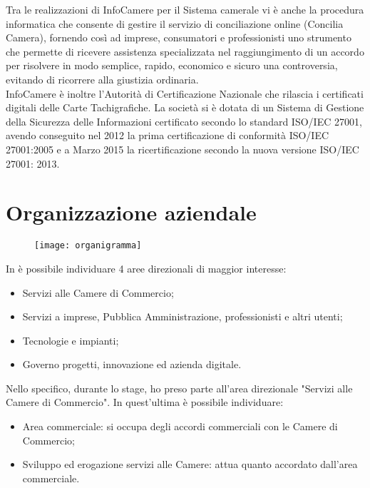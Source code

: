 	Tra le realizzazioni di InfoCamere per il Sistema camerale vi è anche la procedura informatica che consente di gestire il servizio di conciliazione online (Concilia Camera), fornendo così ad imprese, consumatori e professionisti uno strumento che permette di ricevere assistenza specializzata nel raggiungimento di un accordo per risolvere in modo semplice, rapido, economico e sicuro una controversia, evitando di ricorrere alla giustizia ordinaria. \\
	InfoCamere è inoltre l'Autorità di Certificazione Nazionale che rilascia i certificati digitali delle Carte Tachigrafiche.
	La società si è dotata di un Sistema di Gestione della Sicurezza delle Informazioni certificato secondo lo standard ISO/IEC 27001, avendo conseguito nel 2012 la prima certificazione di conformità ISO/IEC 27001:2005 e a Marzo 2015 la ricertificazione secondo la nuova versione ISO/IEC 27001: 2013.

\section{Organizzazione aziendale}
\label{sec:organizzazione_aziendale}

	\begin{figure}[htbp]
		\begin{center}
			\texttt{[image: organigramma]}
		\end{center}
	\end{figure}

	In \nomeAzienda è possibile individuare 4 aree direzionali di maggior interesse:
	\begin{itemize}
		\item{Servizi alle Camere di Commercio;}
		\item{Servizi a imprese, Pubblica Amministrazione, professionisti e altri utenti;}
		\item{Tecnologie e impianti;}
		\item{Governo progetti, innovazione ed azienda digitale.}
	\end{itemize}

	Nello specifico, durante lo stage, ho preso parte all'area direzionale "Servizi alle Camere di Commercio". In quest'ultima è possibile individuare:
	\begin{itemize}
		\item{Area commerciale: si occupa degli accordi commerciali con le Camere di Commercio;}
		\item{Sviluppo ed erogazione servizi alle Camere: attua quanto accordato dall'area commerciale.}
	\end{itemize}

